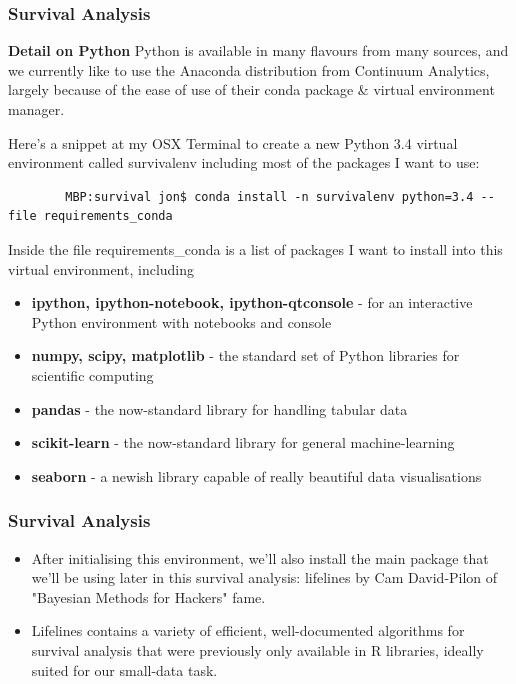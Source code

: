 \documentclass[]{beamer}
\begin{document}
	\begin{frame}[fragile]
		\frametitle{Survival Analysis}
		\noindent \textbf{Detail on Python}
		Python is available in many flavours from many sources, and we currently like to use the Anaconda distribution from Continuum Analytics, largely because of the ease of use of their conda package \& virtual environment manager.
		
		Here's a snippet at my OSX Terminal to create a new Python 3.4 virtual environment called survivalenv including most of the packages I want to use:
		\begin{verbatim}
		MBP:survival jon$ conda install -n survivalenv python=3.4 --file requirements_conda  
		\end{verbatim}
	\end{frame}
	\begin{frame}
		Inside the file requirements\_conda is a list of packages I want to install into this virtual environment, including
		\begin{itemize}
			\item \textbf{ipython, ipython-notebook, ipython-qtconsole} - for an interactive Python environment with notebooks and console
			\item \textbf{numpy, scipy, matplotlib} - the standard set of Python libraries for scientific computing
			\item \textbf{pandas} - the now-standard library for handling tabular data
			\item \textbf{scikit-learn} - the now-standard library for general machine-learning
			\item \textbf{seaborn} - a newish library capable of really beautiful data visualisations
		\end{itemize}
	\end{frame}
	\begin{frame}
		\frametitle{Survival Analysis}
		
		\begin{itemize}
			\item After initialising this environment, we'll also install the main package that we'll be using later in this survival analysis: lifelines by Cam David-Pilon of "Bayesian Methods for Hackers" fame. 
			\item Lifelines contains a variety of efficient, well-documented algorithms for survival analysis that were previously only available in R libraries, ideally suited for our small-data task.
		\end{itemize}
		
	\end{frame}
\end{document}

